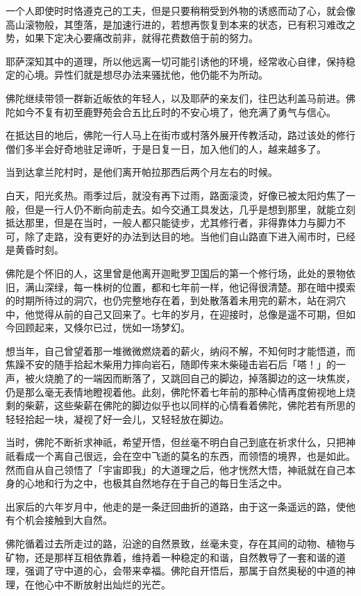 \documentclass[12pt,twoside,openany]{book}
\begin{document}
一个人即使时时恪遵克己的工夫，但是只要稍稍受到外物的诱惑而动了心，就会像高山滚物般，其堕落，是加速行进的，若想再恢复到本来的状态，已有积习难改之势，如果下定决心要痛改前非，就得花费数倍于前的努力。

耶萨深知其中的道理，所以他远离一切可能引诱他的环境，经常收心自律，保持稳定的心境。异性们就是想尽办法来骚扰他，他仍能不为所动。

佛陀继续带领一群新近皈依的年轻人，以及耶萨的亲友们，往巴达利盖马前进。佛陀如今不复有初至鹿野苑会合五比丘时的不安心境了，他充满了勇气与信心。

在抵达目的地后，佛陀一行人马上在街市或村落外展开传教活动，路过该处的修行僧们多半会好奇地驻足谛听，于是日复一日，加入他们的人，越来越多了。

当到达拿兰陀村时，是他们离开帕拉那西后两个月左右的时候。

白天，阳光炙热。雨季过后，就没有再下过雨，路面滚烫，好像已被太阳灼焦了一般，但是一行人仍不断向前走去。如今交通工具发达，几乎是想到那里，就能立刻抵达那里，但是在当时，一般人都只能徒步，尤其修行者，非得靠体力与脚力不可，除了走路，没有更好的办法到达目的地。当他们自山路直下进入闹市时，已经是黄昏时刻。

佛陀是个怀旧的人，这里曾是他离开迦毗罗卫国后的第一个修行场，此处的景物依旧，满山深绿，每一株树的位置，都和七年前一样，他记得很清楚。那在暗中摸索的时期所待过的洞穴，也仍完整地存在着，到处散落着未用完的薪木，站在洞穴中，他觉得从前的自己又回来了。七年的岁月，在迎接时，总像是遥不可期，但如今回顾起来，又倏尔已过，恍如一场梦幻。

想当年，自己曾望着那一堆微微燃烧着的薪火，纳闷不解，不知何时才能悟道，而焦躁不安的随手拾起木柴用力摔向岩石，随即传来木柴碰击岩石后「嗒！」的一声，被火烧脆了的一端因而断落了，又跳回自己的脚边，掉落脚边的这一块焦炭，仍是那么毫无表情地瞪视着他。此刻，佛陀怀着七年前的那种心情再度俯视地上烧剩的柴薪，这些柴薪在佛陀的脚边似乎也以同样的心情看着佛陀，佛陀若有所思的轻轻拾起一块，凝视了好一会儿，又轻轻放在脚边。

当时，佛陀不断祈求神祇，希望开悟，但丝毫不明白自己到底在祈求什么，只把神祇看成一个离自己很远，会在空中飞逝的莫名的东西，而领悟的境界，也是如此。然而自从自己领悟了「宇宙即我」的大道理之后，他才恍然大悟，神祇就在自己本身的心地和行为之中，也极其自然地存在于自己的每日生活之中。

出家后的六年岁月中，他走的是一条迂回曲折的道路，由于这一条遥远的路，使他有个机会接触到大自然。

佛陀循着过去所走过的路，沿途的自然景致，丝毫未变，存在其间的动物、植物与矿物，还是那样互相依靠着，维持着一种稳定的和谐，自然教导了一套和谐的道理，强调了守中道的心，会带来幸福。佛陀自开悟后，那属于自然奥秘的中道的神理，在他心中不断放射出灿烂的光芒。
\end{document}
